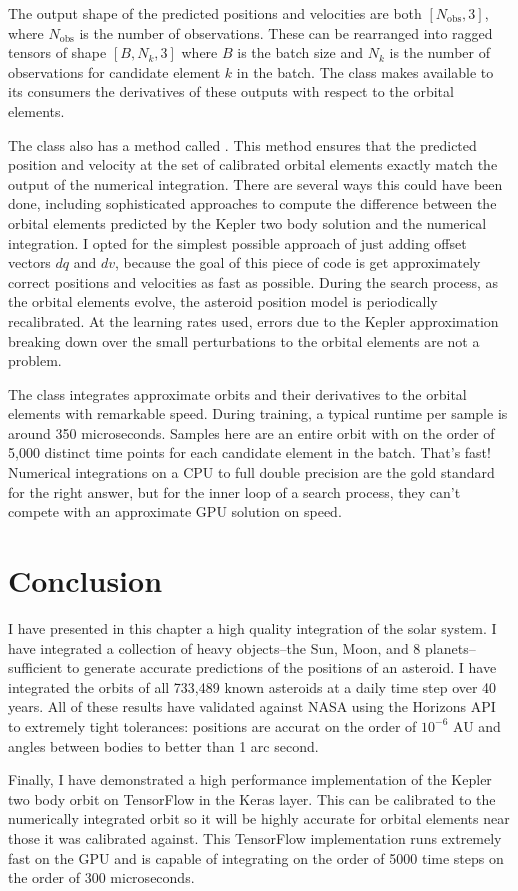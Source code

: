 The output shape of the predicted positions and velocities are both $[N_{\mathrm{obs}}, 3]$, where $N_{\mathrm{obs}}$ is the number of observations.
These can be rearranged into ragged tensors of shape $[B, N_{k}, 3]$ where $B$ is the batch size and $N_{k}$ is the number of observations for 
candidate element $k$ in the batch.
The class makes available to its consumers the derivatives of these outputs with respect to the orbital elements.

The  class also has a method called .
This method ensures that the predicted position and velocity at the set of calibrated orbital elements exactly match the output of the numerical integration.
There are several ways this could have been done, including sophisticated approaches to compute 
the difference between the orbital elements predicted by the Kepler two body solution and the numerical integration.
I opted for the simplest possible approach of just adding offset vectors $dq$ and $dv$,
because the goal of this piece of code is get approximately correct positions and velocities as fast as possible.
During the search process, as the orbital elements evolve, the asteroid position model is periodically recalibrated.
At the learning rates used, errors due to the Kepler approximation breaking down over the small perturbations to the orbital elements are not a problem.

The  class integrates approximate orbits and their derivatives to the orbital elements with remarkable speed.
During training, a typical runtime per sample is around 350 microseconds.
Samples here are an entire orbit with on the order of 5,000 distinct time points for each candidate element in the batch.
That's fast! 
Numerical integrations on a CPU to full double precision are the gold standard for the right answer, 
but for the inner loop of a search process, they can't compete with an approximate GPU solution on speed.

\section{Conclusion}
\label{section_conclusion}
I have presented in this chapter a high quality integration of the solar system.
I have integrated a collection of heavy objects--the Sun, Moon, and 8 planets--
sufficient to generate accurate predictions of the positions of an asteroid.
I have integrated the orbits of all 733,489 known asteroids at a daily time step over 40 years.
All of these results have validated against NASA using the Horizons API to extremely tight tolerances:
positions are accurat on the order of $10^{-6}$ AU and angles between bodies to better than 1 arc second.

Finally, I have demonstrated a high performance implementation of the Kepler two body orbit on TensorFlow in the  Keras layer.
This can be calibrated to the numerically integrated orbit so it will be highly accurate for orbital elements near those it was calibrated against.
This TensorFlow implementation runs extremely fast on the GPU 
and is capable of integrating on the order of 5000 time steps on the order of 300 microseconds.